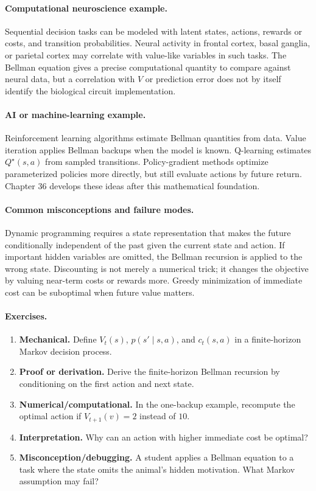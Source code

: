 \paragraph{Computational neuroscience example.}
Sequential decision tasks can be modeled with latent states, actions, rewards or costs, and transition probabilities. Neural activity in frontal cortex, basal ganglia, or parietal cortex may correlate with value-like variables in such tasks. The Bellman equation gives a precise computational quantity to compare against neural data, but a correlation with \(V\) or prediction error does not by itself identify the biological circuit implementation.

\paragraph{AI or machine-learning example.}
Reinforcement learning algorithms estimate Bellman quantities from data. Value iteration applies Bellman backups when the model is known. Q-learning estimates \(Q^\star(s,a)\) from sampled transitions. Policy-gradient methods optimize parameterized policies more directly, but still evaluate actions by future return. Chapter 36 develops these ideas after this mathematical foundation.

\paragraph{Common misconceptions and failure modes.}
Dynamic programming requires a state representation that makes the future conditionally independent of the past given the current state and action. If important hidden variables are omitted, the Bellman recursion is applied to the wrong state. Discounting is not merely a numerical trick; it changes the objective by valuing near-term costs or rewards more. Greedy minimization of immediate cost can be suboptimal when future value matters.

\paragraph{Exercises.}
\begin{enumerate}[label=\textbf{30.3.\arabic*.}, leftmargin=*]
\item \textbf{Mechanical.} Define \(V_t(s)\), \(p(s'\mid s,a)\), and \(c_t(s,a)\) in a finite-horizon Markov decision process.
\item \textbf{Proof or derivation.} Derive the finite-horizon Bellman recursion by conditioning on the first action and next state.
\item \textbf{Numerical/computational.} In the one-backup example, recompute the optimal action if \(V_{t+1}(v)=2\) instead of \(10\).
\item \textbf{Interpretation.} Why can an action with higher immediate cost be optimal?
\item \textbf{Misconception/debugging.} A student applies a Bellman equation to a task where the state omits the animal's hidden motivation. What Markov assumption may fail?
\end{enumerate}

